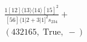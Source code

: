 \documentclass[varwidth, border=5pt]{standalone}
\begin{document}
\begin{my}
$\begin{gathered}
\scriptscriptstyle\frac{1[12]⟨13⟩⟨14⟩[15]^2}{[56]⟨1|2+3|1]^2s_{234}}+\\
\scriptscriptstyle(432165,\;\text{True},\;-)\phantom{+}
\end{gathered}$
\end{my}
\end{document}

